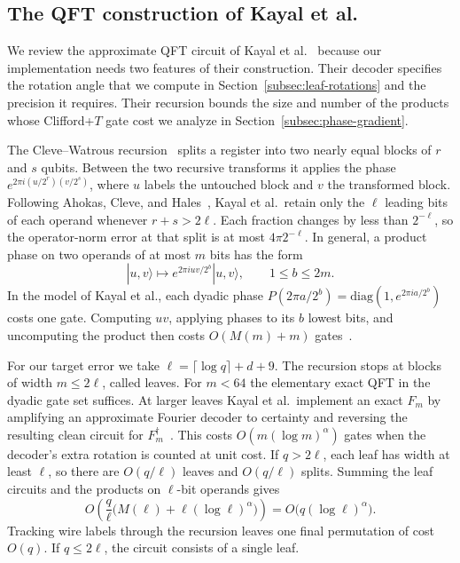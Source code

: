 \documentclass[11pt]{article}
\newcommand{\CFT}{Clifford+$T$}
\begin{document}
\subsection{The QFT construction of Kayal et al.}\label{subsec:short-mult}

We review the approximate QFT circuit of Kayal et al.~\cite[Sections~3 and~4]{kmps2026} because our implementation needs two features of their construction. Their decoder specifies the rotation angle that we compute in Section~\ref{subsec:leaf-rotations} and the precision it requires. Their recursion bounds the size and number of the products whose \CFT{} gate cost we analyze in Section~\ref{subsec:phase-gradient}.

The Cleve--Watrous recursion~\cite{cw2000} splits a register into two nearly equal blocks of $r$ and $s$ qubits. Between the two recursive transforms it applies the phase $e^{2\pi i(u/2^r)(v/2^s)}$, where $u$ labels the untouched block and $v$ the transformed block. Following Ahokas, Cleve, and Hales~\cite{ach2003}, Kayal et al.\ retain only the $\ell$ leading bits of each operand whenever $r+s>2\ell$. Each fraction changes by less than $2^{-\ell}$, so the operator-norm error at that split is at most $4\pi 2^{-\ell}$. In general, a product phase on two operands of at most $m$ bits has the form
\begin{equation}\label{eq:product-phase}
|u, v\rangle \mapsto e^{2\pi i uv/2^b}|u, v\rangle, \qquad 1\le b\le 2m.
\end{equation}
In the model of Kayal et al., each dyadic phase $P(2\pi a/2^b)=\mathrm{diag}(1,e^{2\pi i a/2^b})$ costs one gate. Computing $uv$, applying phases to its $b$ lowest bits, and uncomputing the product then costs $O(M(m)+m)$ gates~\cite[Lemma~2.1]{kmps2026}.

For our target error we take $\ell=\lceil\log q\rceil+d+9$. The recursion stops at blocks of width $m\le 2\ell$, called leaves. For $m<64$ the elementary exact QFT in the dyadic gate set suffices. At larger leaves Kayal et al.\ implement an exact $F_m$ by amplifying an approximate Fourier decoder to certainty and reversing the resulting clean circuit for $F_m^\dagger$~\cite[Lemma~3.1]{kmps2026}. This costs $O(m(\log m)^\alpha)$ gates when the decoder's extra rotation is counted at unit cost. If $q>2\ell$, each leaf has width at least $\ell$, so there are $O(q/\ell)$ leaves and $O(q/\ell)$ splits. Summing the leaf circuits and the products on $\ell$-bit operands gives
\begin{equation}\label{eq:dyadic-cost}
O\!\left(\frac{q}{\ell}\bigl(M(\ell)+\ell(\log\ell)^\alpha\bigr)\right)=O\bigl(q(\log\ell)^\alpha\bigr).
\end{equation}
Tracking wire labels through the recursion leaves one final permutation of cost $O(q)$. If $q\le 2\ell$, the circuit consists of a single leaf.
\end{document}
